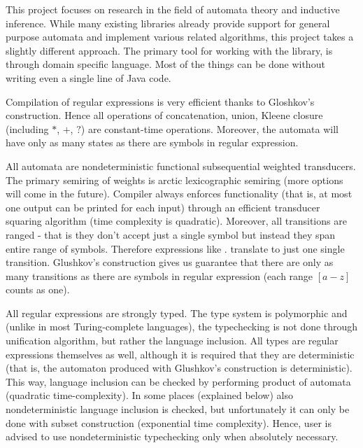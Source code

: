 \documentclass[oneside,polski,logo]{amuthesis}
\author{Bohdan Bondar, Marcin Jałoński, Aleksander Mendoza-Drosik}
\date{Poznań, luty 2021}
\begin{document}
\maketitle
\makestatement

\begin{streszczenie}
This project focuses on research in the field of automata theory and inductive inference. While many existing libraries already provide support for general purpose automata and implement various related algorithms, this project takes a slightly different approach. The primary tool for working with the library, is through domain specific language. Most of the things can be done without writing even a single line of Java code.

Compilation of regular expressions is very efficient thanks to Gloshkov's construction. Hence all operations of concatenation, union, Kleene closure (including $*$, $+$, $?$) are constant-time operations. Moreover, the automata will have only as many states as there are symbols in regular expression.

All automata are nondeterministic functional subsequential weighted transducers. The primary semiring of weights is arctic lexicographic semiring (more options will come in the future). Compiler always enforces functionality (that is, at most one output can be printed for each input) through an efficient transducer squaring algorithm (time complexity is quadratic). Moreover, all transitions are ranged - that is they don't accept just a single symbol but instead they span entire range of symbols. Therefore expressions like $.$ translate to just one single transition. Glushkov's construction gives us guarantee that there are only as many transitions as there are symbols in regular expression (each range $[a-z]$ counts as one).

All regular expressions are strongly typed. The type system is polymorphic and (unlike in most Turing-complete languages), the typechecking is not done through unification algorithm, but rather the language inclusion. All types are regular expressions themselves as well, although it is required that they are deterministic (that is, the automaton produced with Glushkov's construction is deterministic). This way, language inclusion can be checked by performing product of automata (quadratic time-complexity). In some places (explained below) also nondeterministic language inclusion is checked, but unfortunately it can only be done with subset construction (exponential time complexity). Hence, user is advised to use nondeterministic typechecking only when absolutely necessary.


\end{streszczenie}
\end{document}

